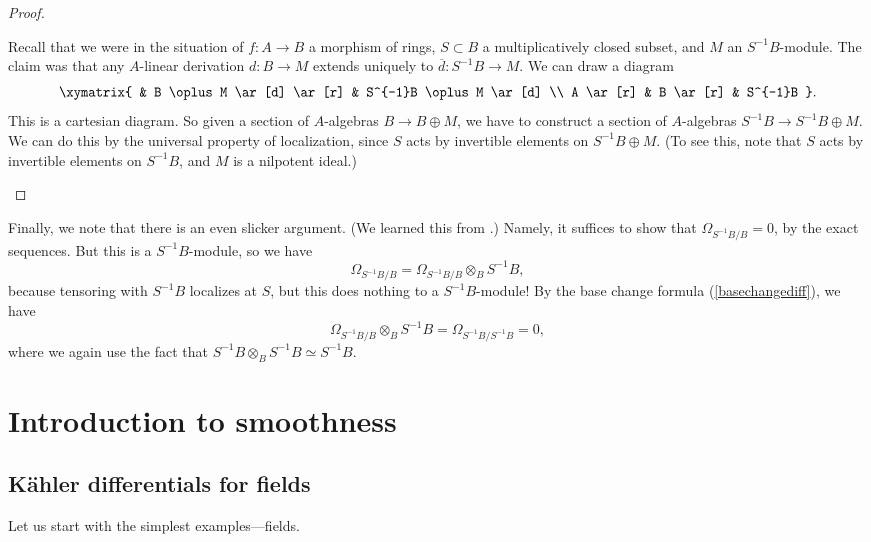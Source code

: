 \begin{proof}
\begin{enumerate}
Recall that we were in the situation of $f: A \to B$  a morphism of rings, $S
\subset B$ a multiplicatively closed subset, and $M$ an $S^{-1}B$-module. The
claim was that any $A$-linear derivation $d: B \to M$ extends uniquely to
$\overline{d}: S^{-1} B \to M$.
We can draw a diagram
\[ \xymatrix{
& B \oplus M \ar[d] \ar[r] &  S^{-1}B \oplus M \ar[d] \\
A \ar[r] &  B \ar[r] &  S^{-1}B
}.\]
This is a cartesian diagram. So given a section of $A$-algebras $B \to B \oplus M$, we have to
construct a section of $A$-algebras $S^{-1}B \to S^{-1}B \oplus M$. We can do this by the
universal property of localization, since $S$ acts by invertible elements on
$S^{-1}B \oplus M$. (To see this, note that $S$ acts by invertible elements on
$S^{-1}B$, and $M$ is a nilpotent ideal.)
\end{enumerate}
\end{proof} 

Finally, we note that there is an even slicker argument. (We learned this from
\cite{Qu}.) 
Namely, it suffices to show that $\Omega_{S^{-1}B/B} =0 $, by the exact
sequences.
But this is a $S^{-1}B$-module, so we have
\[  \Omega_{S^{-1}B/B} = \Omega_{S^{-1}B/B} \otimes_B S^{-1}B, \]
because tensoring with $S^{-1}B$ localizes at $S$, but this does nothing to a
$S^{-1}B$-module! By the base change formula (\cref{basechangediff}), we have
\[ \Omega_{S^{-1}B/B} \otimes_B S^{-1}B = \Omega_{S^{-1}B/S^{-1}B} = 0,  \]
where we again use the fact that $S^{-1} B \otimes_B S^{-1} B \simeq S^{-1}B$.


\section{Introduction to smoothness}
\subsection{K\"ahler differentials for fields}

Let us start with the simplest examples---fields.

